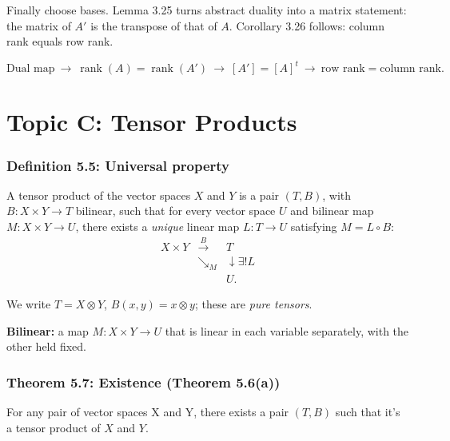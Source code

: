 \documentclass[11pt,a4paper]{article}
\newcommand{\rank}{\operatorname{rank}}
\begin{document}
Finally choose bases. Lemma 3.25 turns abstract duality into a matrix statement: the matrix of \(A'\) is the transpose of that of \(A\). Corollary 3.26 follows: column rank equals row rank.

\[
 \boxed{\text{Dual map}\ \longrightarrow\
 \rank(A)=\rank(A')\ \longrightarrow\
 [A']=[A]^t\ \longrightarrow\
 \text{row rank}=\text{column rank}.}
\]

\clearpage
\part*{Topic C: Tensor Products}

\section*{Definition 5.5: Universal property}
A tensor product of the vector spaces $X$ and $Y$ is a pair \((T,B)\), with \(B:X\times Y\to T\) bilinear, such that for every vector space \(U\) and bilinear map \(M:X\times Y\to U\), there exists a \emph{unique} linear map \(L:T\to U\) satisfying \(M=L\circ B\):
\[
\begin{array}{ccc}X\times Y&\xrightarrow{\ B\ }&T\\&\searrow_{\scriptstyle M}&\downarrow{\scriptstyle\exists!L}\\&&U.\end{array}
\]

We write \(T=X\otimes Y\), \(B(x,y)=x\otimes y\); these are \emph{pure tensors}.
\begin{personalnote}[title=Definitions for understanding]
\textbf{Bilinear:} a map \(M:X\times Y\to U\) that is linear in each variable separately, with the other held fixed.
\end{personalnote}

\section*{Theorem 5.7: Existence (Theorem 5.6(a))}
For any pair of vector spaces X and Y, there exists a pair $(T,B)$ such that it's a tensor product of $X$ and $Y$.
\end{document}
